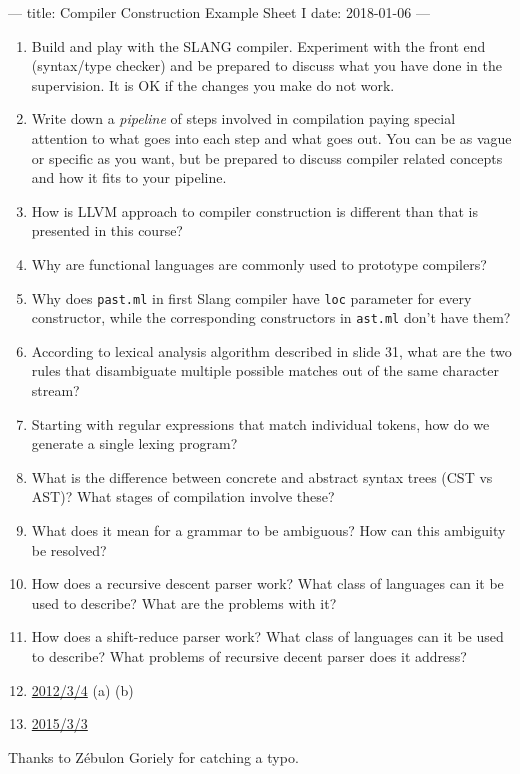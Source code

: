 ---
title: Compiler Construction Example Sheet I
date: 2018-01-06
---



\begin{enumerate}
  \item Build and play with the SLANG compiler. Experiment with the front end
    (syntax/type checker) and be prepared to discuss what you have done in the
    supervision. It is OK if the changes you make do not work.

  \item Write down a \emph{pipeline} of steps involved in compilation paying
    special attention to what goes into each step and what goes out. You can be
    as vague or specific as you want, but be prepared to discuss compiler
    related concepts and how it fits to your pipeline.

  \item How is \textsc{LLVM} approach to compiler construction is different
    than that is presented in this course?

  \item Why are functional languages are commonly used to prototype compilers?

  \item Why does \texttt{past.ml} in first Slang compiler have \texttt{loc}
    parameter for every constructor, while the corresponding constructors in
    \texttt{ast.ml} don't have them?

  \item According to lexical analysis algorithm described in slide 31, what are
    the two rules that disambiguate multiple possible matches out of the same
    character stream?

  \item Starting with regular expressions that match individual tokens, how do
    we generate a single lexing program?

  \item What is the difference between concrete and abstract syntax trees (CST
    vs AST)? What stages of compilation involve these?

  \item What does it mean for a grammar to be ambiguous? How can this ambiguity
    be resolved?

  \item How does a recursive descent parser work? What class of languages can it
    be used to describe? What are the problems with it?

  \item How does a shift-reduce parser work? What class of languages can it be
    used to describe? What problems of recursive decent parser does it address?

  \item \href{http://www.cl.cam.ac.uk/teaching/exams/pastpapers/y2012p3q4.pdf}{2012/3/4} (a) (b)

  \item \href{http://www.cl.cam.ac.uk/teaching/exams/pastpapers/y2015p3q3.pdf}{2015/3/3}
\end{enumerate}

Thanks to Zébulon Goriely for catching a typo.


